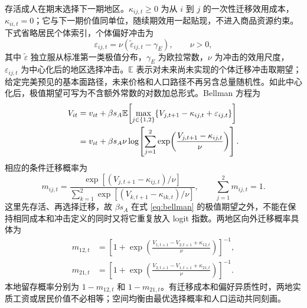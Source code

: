 \documentclass[UTF8,a4paper,zihao=-4,fontset=windows]{ctexart}
\numberwithin{equation}{section}
\newcommand{\E}{\mathbb E}
\begin{document}
存活成人在期末选择下一期地区。$\kappa_{ij,t}\geq0$ 为从 $i$ 到 $j$ 的一次性迁移效用成本，$\kappa_{ii,t}=0$；它与下一期价值同单位，随续期效用一起贴现，不进入商品资源约束。下式省略居民个体索引，个体偏好冲击为
\begin{equation}
  \varepsilon_{ij,t}=\nu(\widetilde\varepsilon_{ij,t}-\gamma_E),
  \qquad \nu>0,
  \label{eq:migration-shocks}
\end{equation}
其中 $\widetilde\varepsilon$ 独立服从标准第一类极值分布，$\gamma_E$ 为欧拉常数，$\nu$ 为冲击的效用尺度，$\varepsilon_{ij,t}$ 为中心化后的地区选择冲击。$\E$ 表示对未来尚未实现的个体迁移冲击取期望；给定完美预见的基本面路径，未来价格和人口路径不再另含总量随机性。如此中心化后，极值期望可写为不含额外常数的对数加总形式。Bellman 方程为
\begin{align}
  V_{it}
   &=v_{it}+\beta s_A\E\!\left[
       \max_{j\in\{1,2\}}
       \{V_{j,t+1}-\kappa_{ij,t}+\varepsilon_{ij,t}\}\right]\notag\\
   &=v_{it}+\beta s_A\nu
       \log\!\left[\sum_{j=1}^2
       \exp\!\left(\frac{V_{j,t+1}-\kappa_{ij,t}}{\nu}\right)\right].
  \label{eq:bellman}
\end{align}
相应的条件迁移概率为
\begin{equation}
  m_{ij,t}=
   \frac{\exp[(V_{j,t+1}-\kappa_{ij,t})/\nu]}
        {\sum_{k=1}^2\exp[(V_{k,t+1}-\kappa_{ik,t})/\nu]},
  \qquad \sum_{j=1}^2m_{ij,t}=1.
  \label{eq:migration-probability}
\end{equation}
这里先存活、再选择迁移，故 $\beta s_A$ 在式 \eqref{eq:bellman} 的极值期望之外，不能在保持相同成本和冲击定义的同时又将它重复放入 logit 指数。两地区向外迁移概率具体为
\begin{align}
  m_{12,t}&=\left[1+\exp\!\left(
      \frac{V_{1,t+1}-V_{2,t+1}+\kappa_{12,t}}{\nu}\right)\right]^{-1},\\
  m_{21,t}&=\left[1+\exp\!\left(
      \frac{V_{2,t+1}-V_{1,t+1}+\kappa_{21,t}}{\nu}\right)\right]^{-1}.
\end{align}
本地留存概率分别为 $1-m_{12,t}$ 和 $1-m_{21,t}$。有迁移成本和偏好异质性时，两地实质工资或居民价值不必相等；空间均衡由最优选择概率和人口运动共同刻画。
\end{document}
